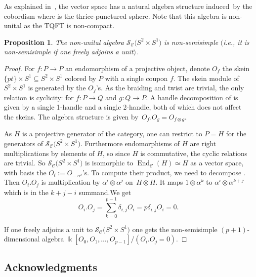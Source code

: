 \documentclass[10pt,a4paper]{amsart}
\newtheorem{proposition}{Proposition}
\numberwithin{equation}{section}
\numberwithin{theorem}{section}
\numberwithin{proposition}{section}
\numberwithin{definition}{section}
\numberwithin{lemma}{section}
\numberwithin{corollary}{section}
\numberwithin{remark}{section}
\numberwithin{example}{section}
\newcommand{\cat}{\mathcal{C}}
\newcommand{\End}{\operatorname{End}}
\newcommand{\FK}{{\Bbbk}}
\newcommand{\TSkein}{{\mathscr{S}}}
\begin{document}
As explained in~\cite{Reutter}, the vector space
\smash{$\TSkein_\cat\bigl(S^2\times S^1\bigr)$} has a natural algebra structure induced~by
the cobordism  where
 is the thrice-punctured sphere.
 Note that this
algebra is non-unital as the TQFT is non-compact.
\begin{proposition}
 The non-unital algebra $\TSkein_\cat\bigl(S^2\times S^1\bigr)$ is
 non-semisimple $($i.e., it is non-semisimple if one freely adjoins a
 unit$)$.
\end{proposition}
\begin{proof}
For $f\colon P\to P$ an endomorphism of a projective object, denote $O_f$ the skein $\{pt\}\times S^1\subseteq S^2\times S^1$ colored by $P$ with a single coupon $f$. The skein module of $S^2\times S^1$ is generated by the $O_f$'s. As the braiding and twist are trivial, the only relation is cyclicity:  for $f\colon P\to Q$ and $g\colon Q\to P$. A handle decomposition of  is given by a single 1-handle and a single 2-handle, both of which does not affect the skeins. The algebra structure is given by~${O_f . O_g=O_{f\otimes g}}$.

As $H$ is a projective generator of the category, one can restrict to $P=H$ for the generators of $\TSkein_\cat\bigl(S^2\times S^1\bigr)$. Furthermore endomorphisms of $H$ are right multiplications by elements of $H$, so since $H$ is commutative, the cyclic relations are trivial. So $\TSkein_\cat\bigl(S^2\times S^1\bigr)$ is isomorphic to $\End_\cat(H)\simeq H$ as a vector space, with basis the $O_i:=O_{-.\alpha^i}$'s.
To compute their product, we need to decompose .
Then $O_i. O_j$
is multiplication by $\alpha^i\otimes \alpha^j$ on~${H\otimes H}$. It maps $1\otimes\alpha^k$ to $\alpha^i\otimes\alpha^{k+j}$ which is in the $k+j-i$ summand.We get
\[
O_i. O_j = \sum_{k=0}^{p-1} \delta_{i,j}O_i = p\delta_{i,j}O_i = 0.\]

If one freely adjoins a unit to $\TSkein_\cat\bigl(S^2\times S^1\bigr)$ one gets the non-semisimple $(p+1)$-dimensional algebra $\FK[O_0,O_1,\dots,O_{p-1}]/(O_i.O_j=0)$.
\end{proof}

\subsection*{Acknowledgments}
\end{document}
